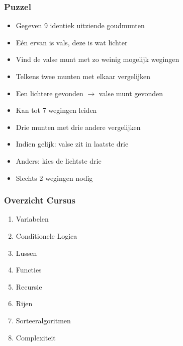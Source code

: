 \documentclass{../khlslides}
\begin{document}
\begin{frame}
  \frametitle{Puzzel}
  \begin{center}
  \end{center}  
  \begin{overprint}
    \begin{itemize}
      \item Gegeven 9 identiek uitziende goudmunten
      \item E\'en ervan is vals, deze is wat lichter
      \item Vind de valse munt met zo weinig mogelijk wegingen
    \end{itemize}

    \begin{itemize}
      \item Telkens twee munten met elkaar vergelijken
      \item Een lichtere gevonden $\rightarrow$ valse munt gevonden
      \item Kan tot 7 wegingen leiden
    \end{itemize}

    \begin{itemize}
      \item Drie munten met drie andere vergelijken
      \item Indien gelijk: valse zit in laatste drie
      \item Anders: kies de lichtste drie
      \item Slechts 2 wegingen nodig
    \end{itemize}

  \end{overprint}
\end{frame}

\begin{frame}
  \frametitle{Overzicht Cursus}
  \begin{enumerate}
    \item Variabelen
    \item Conditionele Logica
    \item Lussen
    \item Functies
    \item Recursie
    \item Rijen
    \item Sorteeralgoritmen
    \item Complexiteit
  \end{enumerate}
\end{frame}
\end{document}
